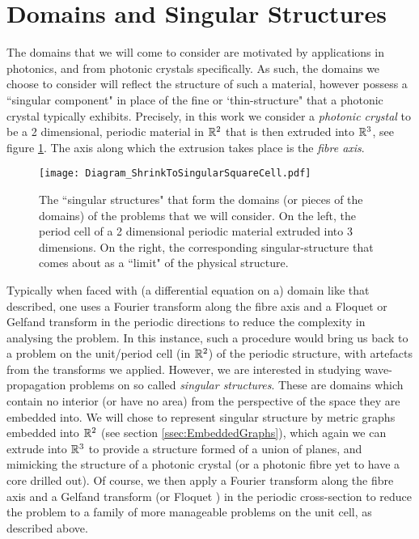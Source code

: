 \section{Domains and Singular Structures} \label{sec:SingularStructures}


The domains that we will come to consider are motivated by applications in photonics, and from photonic crystals specifically.
As such, the domains we choose to consider will reflect the structure of such a material, however possess a ``singular component" in place of the fine or `thin-structure" that a photonic crystal typically exhibits.
Precisely, in this work we consider a \emph{photonic crystal} to be a 2 dimensional, periodic material in $\mathbb{R}^2$ that is then extruded into $\mathbb{R}^3$, see figure \ref{fig:Diagram_ShrinkToSingularSquareCell}.
The axis along which the extrusion takes place is the \emph{fibre axis}.
\begin{figure}
	\centering
	\texttt{[image: Diagram\_ShrinkToSingularSquareCell.pdf]}
	\caption{\label{fig:Diagram_ShrinkToSingularSquareCell} The ``singular structures" that form the domains (or pieces of the domains) of the problems that we will consider. On the left, the period cell of a 2 dimensional periodic material extruded into 3 dimensions. On the right, the corresponding singular-structure that comes about as a ``limit" of the physical structure.}
\end{figure}
Typically when faced with (a differential equation on a) domain like that described, one uses a Fourier transform along the fibre axis and a Floquet or Gelfand transform in the periodic directions to reduce the complexity in analysing the problem.
In this instance, such a procedure would bring us back to a problem on the unit/period cell (in $\mathbb{R}^2$) of the periodic structure, with artefacts from the transforms we applied.
However, we are interested in studying wave-propagation problems on so called \emph{singular structures}.
These are domains which contain no interior (or have no area) from the perspective of the space they are embedded into.
We will chose to represent singular structure by metric graphs embedded into $\mathbb{R}^2$ (see section \ref{ssec:EmbeddedGraphs}), which again we can extrude into $\mathbb{R}^3$ to provide a structure formed of a union of planes, and mimicking the structure of a photonic crystal (or a photonic fibre yet to have a core drilled out).
Of course, we then apply a Fourier transform along the fibre axis and a Gelfand transform (or Floquet ) in the periodic cross-section to reduce the problem to a family of more manageable problems on the unit cell, as described above.

